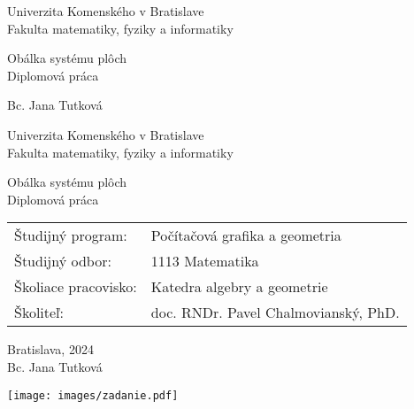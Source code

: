 \documentclass[12pt, twoside]{book}
\theoremstyle{definition}
\def\mfrok{2024}
\def\mfnazov{Obálka systému plôch}
\def\mftyp{Diplomová práca}
\def\mfautor{Bc. Jana Tutková}
\def\mfskolitel{doc. RNDr. Pavel Chalmovianský, PhD. }
\def\mfkonzultant{tit. Meno Priezvisko, tit. }
\def\mfmiesto{Bratislava, \mfrok}
\def\mfodbor{1113 Matematika}
\def\program{ Počítačová grafika a geometria }
\def\mfpracovisko{ Katedra algebry a geometrie }
\begin{document}
     
\frontmatter


\thispagestyle{empty}

\begin{center}
\sc\large
Univerzita Komenského v Bratislave\\
Fakulta matematiky, fyziky a informatiky

\vfill

{\LARGE\mfnazov}\\
\mftyp
\end{center}

\vfill

{\sc\large 
\noindent \mfrok \hfill
\mfautor
}

\eject %


\thispagestyle{empty}
\noindent

\begin{center}
\sc  
\large
Univerzita Komenského v Bratislave\\
Fakulta matematiky, fyziky a informatiky

\vfill

{\LARGE\mfnazov}\\
\mftyp
\end{center}

\vfill

\noindent
\begin{tabular}{ll}
Študijný program: & \program \\
Študijný odbor: & \mfodbor \\
Školiace pracovisko: & \mfpracovisko \\
Školiteľ: & \mfskolitel \\
\end{tabular}

\vfill


\noindent \mfmiesto\\
\mfautor

\eject %





\newpage 
\thispagestyle{empty}
\hspace{-2cm}\texttt{[image: images/zadanie.pdf]}
\end{document}
